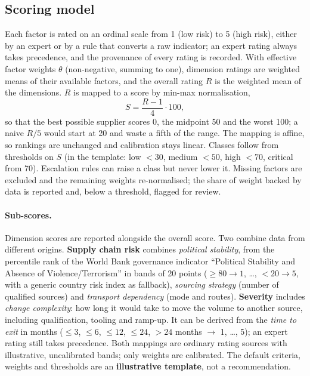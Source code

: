 \documentclass[10pt,twocolumn,a4paper]{article}
\begin{document}
\subsection{Scoring model}
Each factor is rated on an ordinal scale from 1 (low risk) to 5 (high risk), either by an
expert or by a rule that converts a raw indicator; an expert rating always takes
precedence, and the provenance of every rating is recorded. With effective factor weights
$\theta$ (non-negative, summing to one), dimension ratings are weighted means of their
available factors, and the overall rating $R$ is the weighted mean of the dimensions.
$R$ is mapped to a score by min-max normalisation,
\begin{equation}
  S = \frac{R-1}{4}\cdot 100 ,
\end{equation}
so that the best possible supplier scores 0, the midpoint 50 and the worst 100; a naive
$R/5$ would start at 20 and waste a fifth of the range. The mapping is affine, so rankings
are unchanged and calibration stays linear. Classes follow from thresholds on $S$ (in the
template: low $<30$, medium $<50$, high $<70$, critical from 70). Escalation rules can
raise a class but never lower it. Missing factors are excluded and the remaining weights
re-normalised; the share of weight backed by data is reported and, below a threshold,
flagged for review.

\paragraph{Sub-scores.} Dimension scores are reported alongside the overall score. Two
combine data from different origins. \textbf{Supply chain risk} combines \emph{political
stability}, from the percentile rank of the World Bank governance indicator ``Political
Stability and Absence of Violence/Terrorism'' \cite{kaufmann2011} in bands of 20 points
($\geq 80 \rightarrow 1$, \ldots, $<20 \rightarrow 5$, with a generic country risk index
as fallback), \emph{sourcing strategy} (number of qualified sources) and \emph{transport
dependency} (mode and routes). \textbf{Severity} includes \emph{change complexity}: how
long it would take to move the volume to another source, including qualification,
tooling and ramp-up. It can be derived from the \emph{time to exit} in months ($\leq 3$,
$\leq 6$, $\leq 12$, $\leq 24$, $>24$ months $\rightarrow$ 1, \ldots, 5); an expert rating still
takes precedence. Both mappings are ordinary rating sources with illustrative,
uncalibrated bands; only weights are calibrated. The default criteria, weights and
thresholds are an \textbf{illustrative template}, not a recommendation.
\end{document}
